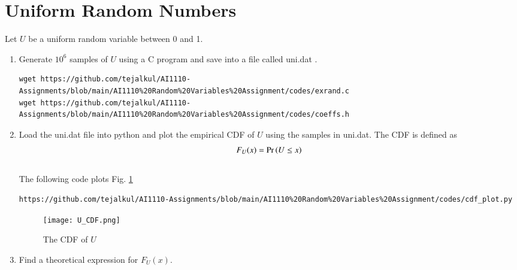 \documentclass[journal,12pt,twocolumn]{IEEEtran}
\renewcommand\thesection{\arabic{section}}
\begin{document}
\section{Uniform Random Numbers}
Let $U$ be a uniform random variable between 0 and 1.
\begin{enumerate}[label=\thesection.\arabic*
,ref=\thesection.\theenumi]
\item Generate $10^6$ samples of $U$ using a C program and save into a file called uni.dat .
\\
\solution 
\begin{lstlisting}
wget https://github.com/tejalkul/AI1110-Assignments/blob/main/AI1110%20Random%20Variables%20Assignment/codes/exrand.c
wget https://github.com/tejalkul/AI1110-Assignments/blob/main/AI1110%20Random%20Variables%20Assignment/codes/coeffs.h
\end{lstlisting}
%
\item
Load the uni.dat file into python and plot the empirical CDF of $U$ using the samples in uni.dat. The CDF is defined as
\begin{align}
F_{U}(x) = \Pr\left(U \le x\right)
\end{align}
\\
\solution  The following code plots Fig. \ref{fig:uni_cdf}
\begin{lstlisting}
https://github.com/tejalkul/AI1110-Assignments/blob/main/AI1110%20Random%20Variables%20Assignment/codes/cdf_plot.py
\end{lstlisting}
\begin{figure}
\centering
\texttt{[image: U\_CDF.png]}
\caption{The CDF of $U$}
\label{fig:uni_cdf}
\end{figure}
%
\item
Find a  theoretical expression for $F_{U}(x)$.

\solution


\end{enumerate}
\end{document}
